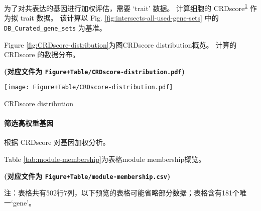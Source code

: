 \documentclass[
]{article}
\begin{document}
为了对共表达的基因进行加权评估，需要 `trait' 数据。
计算细胞的 CRDscore\textsuperscript{\protect\hyperlink{ref-SingleCellTraHeLe2022}{1}} 作为拟 trait 数据。
该计算以 Fig. \ref{fig:intersects-all-used-gene-sets} 中的 \texttt{DB\_Curated\_gene\_sets} 为基准。

Figure \ref{fig:CRDscore-distribution}为图CRDscore distribution概览。
计算的 CRDscore 的数据分布。

\textbf{(对应文件为 \texttt{Figure+Table/CRDscore-distribution.pdf})}

\def\@captype{figure}
\begin{center}
\texttt{[image: Figure+Table/CRDscore-distribution.pdf]}
\caption{CRDscore distribution}\label{fig:CRDscore-distribution}
\end{center}

\hypertarget{weighted}{%
\paragraph{筛选高权重基因}\label{weighted}}

根据 CRDscore 对基因加权分析。

Table \ref{tab:module-membership}为表格module membership概览。

\textbf{(对应文件为 \texttt{Figure+Table/module-membership.csv})}

\begin{center}\begin{tcolorbox}[colback=gray!10, colframe=gray!50, width=0.9\linewidth, arc=1mm, boxrule=0.5pt]注：表格共有502行7列，以下预览的表格可能省略部分数据；表格含有181个唯一`gene'。
\end{tcolorbox}
\end{center}
\end{document}
